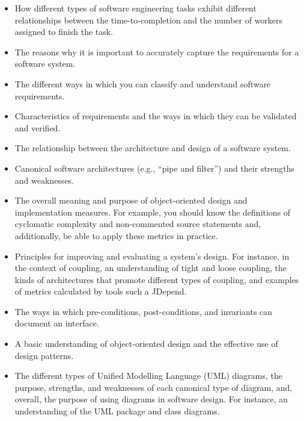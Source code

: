 \begin{itemize}
  \item How different types of software engineering tasks exhibit different relationships between the time-to-completion
    and the number of workers assigned to finish the task.

  \item The reasons why it is important to accurately capture the requirements for a software system.

  \item The different ways in which you can classify and understand software requirements.

  \item Characteristics of requirements and the ways in which they can be validated and verified.

  \item The relationship between the architecture and design of a software system.

  \item Canonical software architectures (e.g., ``pipe and filter'') and their strengths and weaknesses.

  \item The overall meaning and purpose of object-oriented design and implementation measures. For example, you should
    know the definitions of cyclomatic complexity and non-commented source statements and, additionally, be
    able to apply these metrics in practice.

  \item Principles for improving and evaluating a system's design. For instance, in the context of coupling, an
    understanding of tight and loose coupling, the kinds of architectures that promote different types of coupling, and
    examples of metrics calculated by tools such a JDepend.

  \item The ways in which pre-conditions, post-conditions, and invariants can document an interface.

  \item A basic understanding of object-oriented design and the effective use of design patterns.

  \item The different types of Unified Modelling Language (UML) diagrams, the purpose, strengths, and weaknesses of each
    canonical type of diagram, and, overall, the purpose of using diagrams in software design. For instance, an
    understanding of the UML package and class diagrams.


\end{itemize}
